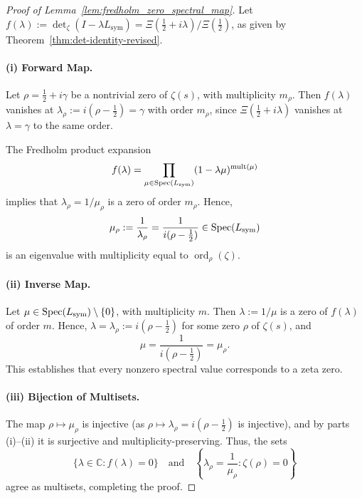 \begin{proof}[Proof of Lemma~\ref{lem:fredholm_zero_spectral_map}]
Let \( f(\lambda) := \det\nolimits_\zeta(I - \lambda L_{\mathrm{sym}}) = \Xi(\tfrac{1}{2} + i\lambda)/\Xi(\tfrac{1}{2}) \), as given by Theorem~\ref{thm:det-identity-revised}.

\paragraph{(i) Forward Map.}
Let \( \rho = \tfrac{1}{2} + i\gamma \) be a nontrivial zero of \( \zeta(s) \), with multiplicity \( m_\rho \). Then \( f(\lambda) \) vanishes at \( \lambda_\rho := i(\rho - \tfrac{1}{2}) = \gamma \) with order \( m_\rho \), since \(\Xi(\tfrac{1}{2} + i\lambda)\) vanishes at \( \lambda = \gamma \) to the same order.

The Fredholm product expansion
\[
f(\lambda) = \prod_{\mu \in \operatorname{Spec}(L_{\mathrm{sym}})} (1 - \lambda \mu)^{\operatorname{mult}(\mu)}
\]
implies that \( \lambda_\rho = 1/\mu_\rho \) is a zero of order \( m_\rho \). Hence,
\[
\mu_\rho := \frac{1}{\lambda_\rho} = \frac{1}{i(\rho - \tfrac{1}{2})} \in \operatorname{Spec}(L_{\mathrm{sym}})
\]
is an eigenvalue with multiplicity equal to \( \operatorname{ord}_\rho(\zeta) \).

\paragraph{(ii) Inverse Map.}
Let \( \mu \in \operatorname{Spec}(L_{\mathrm{sym}}) \setminus \{0\} \), with multiplicity \( m \). Then \( \lambda := 1/\mu \) is a zero of \( f(\lambda) \) of order \( m \). Hence, \( \lambda = \lambda_\rho := i(\rho - \tfrac{1}{2}) \) for some zero \( \rho \) of \( \zeta(s) \), and
\[
\mu = \frac{1}{i(\rho - \tfrac{1}{2})} = \mu_\rho.
\]
This establishes that every nonzero spectral value corresponds to a zeta zero.

\paragraph{(iii) Bijection of Multisets.}
The map \( \rho \mapsto \mu_\rho \) is injective (as \(\rho \mapsto \lambda_\rho = i(\rho - \tfrac{1}{2})\) is injective), and by parts (i)–(ii) it is surjective and multiplicity-preserving. Thus, the sets
\[
\{ \lambda \in \mathbb{C} : f(\lambda) = 0 \}
\quad \text{and} \quad
\left\{ \lambda_\rho = \frac{1}{\mu_\rho} : \zeta(\rho) = 0 \right\}
\]
agree as multisets, completing the proof.
\end{proof}
% 
